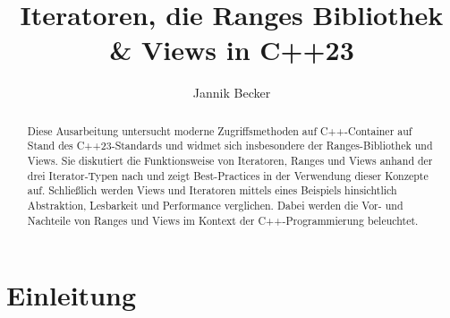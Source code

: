 \documentclass[runningheads]{llncs}
\begin{document}
\title{Iteratoren, die Ranges Bibliothek \& Views in C++23}
\author{Jannik Becker}
\institute{}
\maketitle
\vspace{-.5cm}
\begin{abstract}


	Diese Ausarbeitung untersucht moderne Zugriffsmethoden auf C++-Container auf Stand des C++23-Standards und widmet sich insbesondere der Ranges-Bibliothek und Views.
	Sie diskutiert die Funktionsweise von Iteratoren, Ranges und Views anhand der drei Iterator-Typen nach \cite{plp} und zeigt Best-Practices in der Verwendung dieser Konzepte auf.
	Schließlich werden Views und Iteratoren mittels eines Beispiels hinsichtlich Abstraktion, Lesbarkeit und Performance verglichen.
	Dabei werden die Vor- und Nachteile von Ranges und Views im Kontext der C++-Programmierung beleuchtet.
\end{abstract}

\section{Einleitung}
\end{document}
